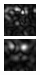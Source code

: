 \begin{figure}[ht]
\begin{center}
 \includegraphics[width=\columnwidth/9]{ch4/figures/mag_-1_7.jpg}\\
 \includegraphics[width=\columnwidth/9]{ch4/figures/mag_0_0.jpg}

\end{center}
\end{figure}
